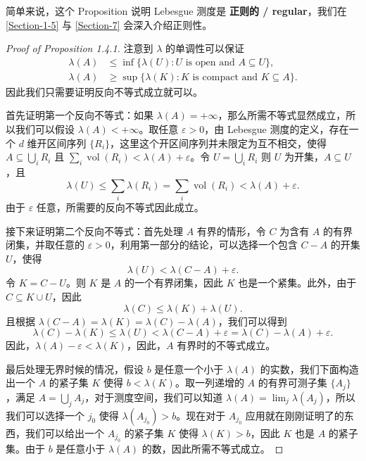 \documentclass[11pt]{article}
\newcommand{\vol}{\operatorname{vol}}
\begin{document}
简单来说，这个 Proposition 说明 Lebesgue 测度是 {\normalfont\bfseries 正则的 / regular}，我们在 \ref{Section-1-5} 与 \ref{Section-7} 会深入介绍正则性。

\begin{proof}[Proof of Proposition 1.4.1]
    注意到 $\lambda$ 的单调性可以保证
    \begin{align*}
        \lambda(A) & \le \inf\{\lambda(U) : U \text{ is open and } A \subseteq U\},    \\
        \lambda(A) & \ge \sup\{\lambda(K) : K \text{ is compact and } K \subseteq A\}.
    \end{align*}
    因此我们只需要证明反向不等式成立就可以。

    首先证明第一个反向不等式：如果 $\lambda(A)=+\infty$，那么所需不等式显然成立，所以我们可以假设 $\lambda(A)<+\infty$。取任意 $\varepsilon > 0$，由 Lebesgue 测度的定义，存在一个 $d$ 维开区间序列 $\{R_i\}$，这里这个开区间序列并未限定为互不相交，使得 $A \subseteq \bigcup_i R_i$ 且 $\sum_i \vol(R_i) < \lambda(A) + \varepsilon$。令 $U = \bigcup_i R_i$ 则 $U$ 为开集，$A \subseteq U$，且
    \[
        \lambda(U) \le \sum_i \lambda(R_i) = \sum_i \vol(R_i) < \lambda(A) + \varepsilon.
    \]
    由于 $\varepsilon$ 任意，所需要的反向不等式因此成立。

    接下来证明第二个反向不等式：首先处理 $A$ 有界的情形，令 $C$ 为含有 $A$ 的有界闭集，并取任意的 $\varepsilon > 0$，利用第一部分的结论，可以选择一个包含 $C-A$ 的开集 $U$，使得
    \[
        \lambda(U) < \lambda(C-A) + \varepsilon.
    \]
    令 $K = C-U$。则 $K$ 是 $A$ 的一个有界闭集，因此 $K$ 也是一个紧集。此外，由于 $C \subseteq K \cup U$，因此
    \[
        \lambda(C) \le \lambda(K) + \lambda(U).
    \]
    且根据 $\lambda(C-A) = \lambda(K) = \lambda(C) - \lambda(A)$，我们可以得到
    \[
        \lambda(C) - \lambda(K)
        \le \lambda(U)
        < \lambda(C-A) + \varepsilon
        = \lambda(C) - \lambda(A) + \varepsilon.
    \]
    因此，$\lambda(A) - \varepsilon < \lambda(K)$，因此，$A$ 有界时的不等式成立。

    最后处理无界时候的情况，假设 $b$ 是任意一个小于 $\lambda(A)$ 的实数，我们下面构造出一个 $A$ 的紧子集 $K$ 使得 $b < \lambda(K)$。取一列递增的 $A$ 的有界可测子集 $\{A_j\}$，满足 $A = \bigcup_j A_j$，对于测度空间，我们可以知道 $\lambda(A)=\lim_j \lambda(A_j)$，所以我们可以选择一个 $j_0$ 使得 $\lambda(A_{j_0}) > b$。现在对于 $A_{j_0}$ 应用就在刚刚证明了的东西，我们可以给出一个 $A_{j_0}$ 的紧子集 $K$ 使得 $\lambda(K) > b$，因此 $K$ 也是 $A$ 的紧子集。由于 $b$ 是任意小于 $\lambda(A)$ 的数，因此所需不等式成立。
\end{proof}
\end{document}
